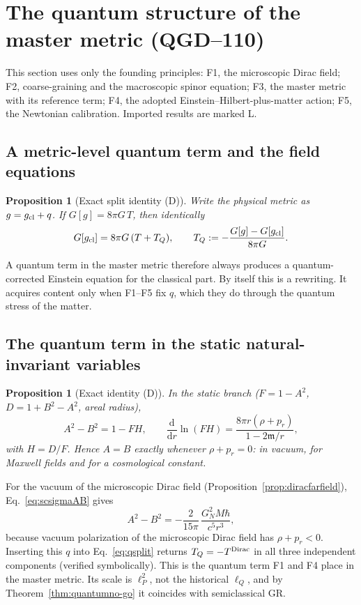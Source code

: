 \documentclass[11pt,a4paper]{article}
\newtheorem{proposition}[theorem]{Proposition}
\begin{document}
\section{The quantum structure of the master metric (QGD--110)}\label{sec:quantumstructure}
This section uses only the founding principles: F1, the microscopic Dirac field;
F2, coarse-graining and the macroscopic spinor equation; F3, the master metric
with its reference term; F4, the adopted Einstein--Hilbert-plus-matter action;
F5, the Newtonian calibration. Imported results are marked L.

\subsection{A metric-level quantum term and the field equations}
\begin{proposition}[Exact split identity (D)]\label{prop:split}
Write the physical metric as $g=g_{\rm cl}+q$. If $G[g]=8\pi G\,T$, then
identically
\begin{equation}\label{eq:qsplit}
G[g_{\rm cl}]=8\pi G\,(T+T_Q),\qquad T_Q:=-\frac{G[g]-G[g_{\rm cl}]}{8\pi G}.
\end{equation}
\end{proposition}
\noindent A quantum term in the master metric therefore always produces a
quantum-corrected Einstein equation for the classical part. By itself this is a
rewriting. It acquires content only when F1--F5 fix $q$, which they do through the
quantum stress of the matter.

\subsection{The quantum term in the static natural-invariant variables}
\begin{proposition}[Exact identity (D)]\label{prop:ABFH}
In the static branch ($F=1-A^2$, $D=1+B^2-A^2$, areal radius),
\begin{equation}\label{eq:ABFH}
A^2-B^2=1-FH,\qquad \frac{\mathrm d}{\mathrm dr}\ln(FH)=\frac{8\pi r(\rho+p_r)}{1-2\mathfrak m/r},
\end{equation}
with $H=D/F$. Hence $A=B$ exactly whenever $\rho+p_r=0$: in vacuum, for Maxwell
fields and for a cosmological constant.
\end{proposition}
\noindent For the vacuum of the microscopic Dirac field (Proposition~\ref{prop:diracfarfield}),
Eq.~\eqref{eq:scsigmaAB} gives
\begin{equation}\label{eq:ABquantum}
A^2-B^2=-\frac{2}{15\pi}\,\frac{G_N^2M\hbar}{c^5r^3},
\end{equation}
because vacuum polarization of the microscopic Dirac field has $\rho+p_r<0$. Inserting this $q$ into
Eq.~\eqref{eq:qsplit} returns $T_Q=-T^{\rm Dirac}$ in all three independent
components (verified symbolically). This is the quantum term F1 and F4 place in the
master metric. Its scale is $\ell_P^2$, not the historical $\ell_Q$, and by
Theorem~\ref{thm:quantumno-go} it coincides with semiclassical GR.
\end{document}
